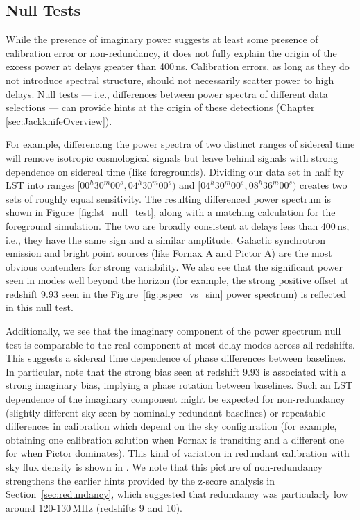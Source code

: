 \subsection{Null Tests}\label{sec:nulls}

While the presence of imaginary power suggests at least some presence of calibration error or non-redundancy, it does not fully explain the origin of the excess power at delays greater than 400\,ns. Calibration errors, as long as they do not introduce
spectral structure, should not necessarily scatter power to high delays. Null tests --- i.e., differences between
power spectra of different data selections --- can provide hints at the origin of these detections (Chapter \ref{sec:JackknifeOverview}).

For example, differencing the power spectra of two distinct ranges of sidereal time will remove
isotropic cosmological signals but leave behind signals with strong dependence on sidereal time (like foregrounds).
Dividing our data set in half by LST into ranges $ [00^{h}30^{m}00^{s}, 04^{h}30^{m}00^{s}) $
and $ [04^{h}30^{m}00^{s}, 08^{h}36^{m}00^{s}) $ creates two sets of roughly equal sensitivity.
The resulting differenced power spectrum is shown in Figure~\ref{fig:lst_null_test}, along with a matching calculation for the foreground simulation.
The two are broadly consistent at
delays less than 400\,ns, i.e., they have the same sign and a
similar amplitude. Galactic synchrotron emission and bright point sources (like Fornax A
and Pictor A) are the most obvious contenders for strong variability. We also see that the significant power seen in modes well beyond the horizon (for example, the strong positive offset at redshift 9.93 seen in the Figure~\ref{fig:pspec_vs_sim} power spectrum) is reflected in this null test.

Additionally, we see that the imaginary component of the power spectrum null test is comparable to the real component at most delay modes across all redshifts. 
This suggests a sidereal time dependence of phase differences between baselines. In particular, note that the strong bias seen at redshift 9.93 is associated with a strong imaginary bias, implying a phase rotation between baselines. Such an LST dependence of the imaginary component might be expected for non-redundancy (slightly different sky seen by nominally redundant baselines) or repeatable differences in calibration which depend on the sky configuration (for example, obtaining one calibration solution when Fornax is transiting and a different one for when Pictor dominates). This kind of variation in redundant calibration with sky flux density is shown in \citet{joseph_et_al2018}. We note that this picture of non-redundancy strengthens the earlier hints provided by the z-score analysis in Section~\ref{sec:redundancy}, which suggested that redundancy was particularly low around $120$-$130$\,MHz (redshifts 9 and 10).


